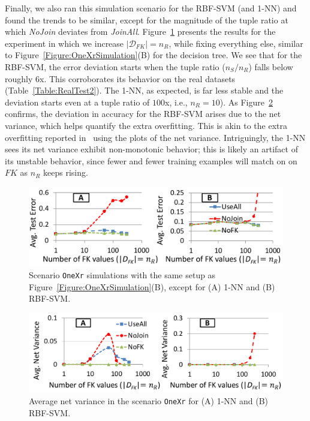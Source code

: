 \documentclass{vldb}
\begin{document}
Finally, we also ran this simulation scenario for the RBF-SVM (and 1-NN) and found the trends to be similar, except for the magnitude of the tuple ratio at which 
\textit{NoJoin} deviates from \textit{JoinAll}. Figure~\ref{Figure:OneXr1nnSVMSimulation} presents the results for the experiment in which we increase $|\mathcal{D}_{FK}|=n_R$, 
while fixing everything else, similar to Figure~\ref{Figure:OneXrSimulation}(B) for the decision tree. We see that for the RBF-SVM, the error deviation starts when the 
tuple ratio ($n_S/n_R$) falls below roughly $6$x. This corroborates its behavior on the real datasets (Table~\ref{Table:RealTest2}).
The 1-NN, as expected, is far less stable and the deviation starts even at a tuple ratio of $100$x, i.e., $n_R = 10$).
As Figure~\ref{Figure:OneXr1nnSVMSimulationVariance} confirms, the deviation in accuracy for the RBF-SVM arises due to the net variance, 
which helps quantify the extra overfitting. This is akin to the extra overfitting reported in~\cite{hamlet} using the plots of the net variance.
Intriguingly, the 1-NN sees its net variance exhibit non-monotonic behavior; this is likely an artifact of its unstable behavior, since fewer and fewer
training examples will match on on $FK$ as $n_R$ keeps rising.

\begin{figure}[t]
\centering
\includegraphics[width=0.99\linewidth]{onexr_svm_1nn.pdf}
\vspace{1mm}
\caption{Scenario \texttt{OneXr} simulations with the same setup as Figure~\ref{Figure:OneXrSimulation}(B), except for (A) 1-NN and (B) RBF-SVM.}
\label{Figure:OneXr1nnSVMSimulation}
\end{figure}

\begin{figure}[t]
\centering
\includegraphics[width=0.99\linewidth]{variance.pdf}
\vspace{1mm}
\caption{Average net variance in the scenario \texttt{OneXr} for (A) 1-NN and (B) RBF-SVM.}
\label{Figure:OneXr1nnSVMSimulationVariance}
\end{figure}
\end{document}
